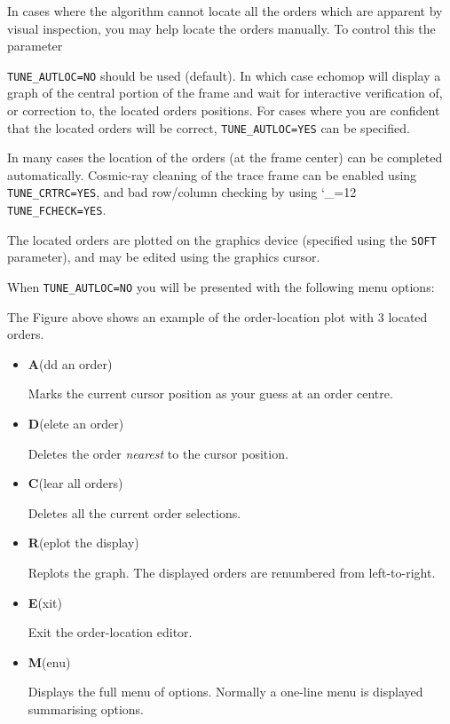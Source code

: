 \documentclass[11pt,twoside]{article}
\makeatletter
\newcommand{\htmlref}[2]{#1}
\newcommand{\sunspec}[2]{#1}
\renewcommand{\sunspec}[2]{#2}
\newcommand{\indexcmdname}[1]{\index{#1@\protect\cmdname{#1}}}
\renewcommand{\indexcmdname}[1]{}
\newcommand{\cmdname}{\begingroup \catcode`\_=12 \realcmdname}
\newcommand{\realcmdname}[1]{\endgroup\texttt{#1}}
\makeatother
\begin{document}
\begin{itemize}
In cases where the algorithm cannot locate all the orders which are
apparent by visual inspection, you may help locate the orders
manually.  To control this the parameter
\indexcmdname{TUNE_AUTLOC}
\htmlref{{\tt TUNE\_AUTLOC=NO}}{par_TUNE_AUTLOC}
should be used (default). In which case {\sc echomop} will display a graph
of the central portion of the frame and wait for interactive
verification of, or correction to, the located orders positions. For
cases where you are confident that the located orders will be
correct, \texttt{TUNE\_AUTLOC=YES} can be specified.

In many cases the location of the orders (at the frame center) can be
completed automatically. Cosmic-ray cleaning of the trace frame can
be enabled using \texttt{TUNE\_CRTRC=YES}, and bad row/column checking
by using \cmdname{TUNE_FCHECK=YES}\@.
\indexcmdname{TUNE_FCHECK}
The located orders are plotted on the graphics device (specified
using the \texttt{SOFT} parameter), and may be edited using the graphics
cursor.

When {\tt TUNE\_AUTLOC=NO} you will be presented with the following menu
options:

\sunspec{Figure~\ref{fi_locate}}{The Figure above}
shows an example of the order-location plot with 3 located orders.

\begin{itemize}

\item {\sunspec{\Large\tt}{\bf} A}(dd an order)

      Marks the current cursor position as your guess at an order centre.

\item {\sunspec{\Large\tt}{\bf} D}(elete an order)

      Deletes the order {\em nearest} to the cursor position.


\item {\sunspec{\Large\tt}{\bf} C}(lear all orders)

      Deletes all the current order selections.

\item {\sunspec{\Large\tt}{\bf} R}(eplot the display)

      Replots the graph.
      The displayed orders are renumbered from left-to-right.

\item {\sunspec{\Large\tt}{\bf} E}(xit)

      Exit the order-location editor.

\item {\sunspec{\Large\tt}{\bf} M}(enu)

      Displays the full menu of options.
      Normally a one-line menu is displayed summarising options.

\end{itemize}
\end{itemize}
\end{document}
